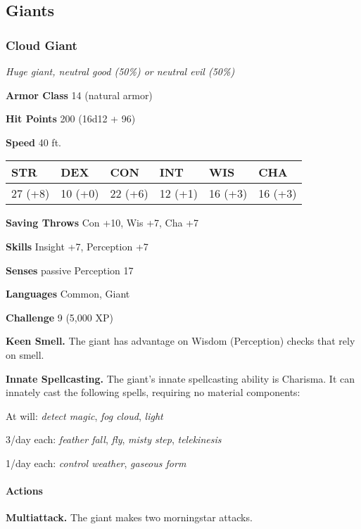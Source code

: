 \documentclass[
]{article}
\begin{document}
\hypertarget{giants}{%
\subsection{Giants}\label{giants}}

\hypertarget{cloud-giant}{%
\subsubsection{Cloud Giant}\label{cloud-giant}}

\emph{Huge giant, neutral good (50\%) or neutral evil (50\%)}

\textbf{Armor Class} 14 (natural armor)

\textbf{Hit Points} 200 (16d12 + 96)

\textbf{Speed} 40 ft.

\begin{longtable}[]{@{}llllll@{}}
\toprule
STR & DEX & CON & INT & WIS & CHA\tabularnewline
\midrule
\endhead
27 (+8) & 10 (+0) & 22 (+6) & 12 (+1) & 16 (+3) & 16 (+3)\tabularnewline
\bottomrule
\end{longtable}

\textbf{Saving Throws} Con +10, Wis +7, Cha +7

\textbf{Skills} Insight +7, Perception +7

\textbf{Senses} passive Perception 17

\textbf{Languages} Common, Giant

\textbf{Challenge} 9 (5,000 XP)

\textbf{Keen Smell.} The giant has advantage on Wisdom (Perception)
checks that rely on smell.

\textbf{Innate Spellcasting.} The giant's innate spellcasting ability is
Charisma. It can innately cast the following spells, requiring no
material components:

At will: \emph{detect magic}, \emph{fog cloud}, \emph{light}

3/day each: \emph{feather fall}, \emph{fly}, \emph{misty step},
\emph{telekinesis}

1/day each: \emph{control weather}, \emph{gaseous form}

\hypertarget{actions-6}{%
\paragraph{Actions}\label{actions-6}}

\textbf{Multiattack.} The giant makes two morningstar attacks.
\end{document}
